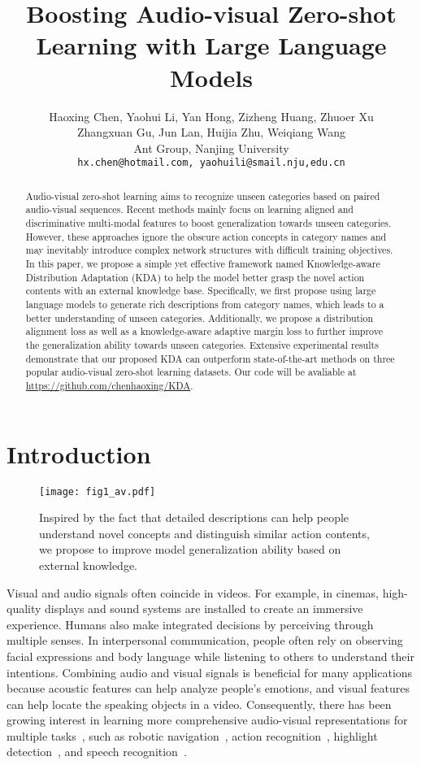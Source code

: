 \documentclass[10pt,twocolumn,letterpaper]{article}
\title{Boosting Audio-visual Zero-shot Learning with Large Language Models}
\author{Haoxing Chen, Yaohui Li, Yan Hong, Zizheng Huang, Zhuoer Xu\\  Zhangxuan Gu, Jun Lan, Huijia Zhu, Weiqiang Wang\\
Ant Group, Nanjing University\\
{\tt\small hx.chen@hotmail.com, yaohuili@smail.nju,edu.cn}}
\begin{document}
\maketitle

\begin{abstract}
Audio-visual zero-shot learning aims to recognize unseen categories based on paired audio-visual sequences. Recent methods mainly focus on learning aligned and discriminative multi-modal features to boost generalization towards unseen categories. However, these approaches ignore the obscure action concepts in category names and may inevitably introduce complex network structures with difficult training objectives. In this paper, we propose a simple yet effective framework named Knowledge-aware Distribution Adaptation (KDA) to help the model better grasp the novel action contents with an external knowledge base. Specifically, we first propose using large language models to generate rich descriptions from category names, which leads to a better understanding of unseen categories. Additionally, we propose a distribution alignment loss as well as a knowledge-aware adaptive margin loss to further improve the generalization ability towards unseen categories. Extensive experimental results demonstrate that our proposed KDA can outperform state-of-the-art methods on three popular audio-visual zero-shot learning datasets. Our code will be avaliable at \url{https://github.com/chenhaoxing/KDA}.

\end{abstract}

\section{Introduction}
\begin{figure}[t]
	\centering
	\texttt{[image: fig1\_av.pdf]}
	\caption{Inspired by the fact that detailed descriptions can help people understand novel concepts and distinguish similar action contents, we propose to improve model generalization ability based on external knowledge.}
	\label{motivation}
\end{figure}
Visual and audio signals often coincide in videos. For example, in cinemas, high-quality displays and sound systems are installed to create an immersive experience. 
Humans also make integrated decisions by perceiving through multiple senses. 
In interpersonal communication, people often rely on observing facial expressions and body language while listening to others to understand their intentions.
Combining audio and visual signals is beneficial for many applications because acoustic features can help analyze people's emotions, and visual features can help locate the speaking objects in a video.
Consequently, there has been growing interest in learning more comprehensive audio-visual representations for multiple tasks~\cite{CASP-Net,egoav,AVFace,MIR-GAN}, such as robotic navigation~\cite{avms,AVLEN}, action recognition~\cite{CAAV}, highlight detection~\cite{JVAVHD}, and speech recognition~\cite{MIR-GAN}.
\end{document}
